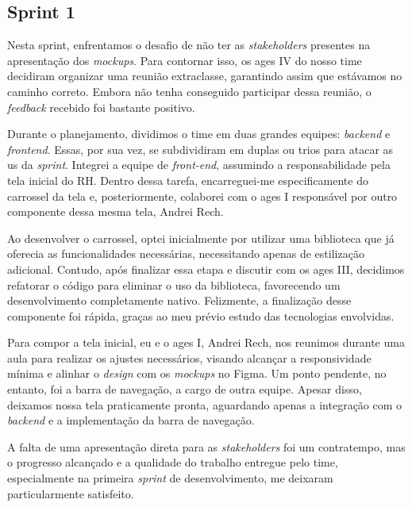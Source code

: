 \subsection{Sprint 1}

Nesta sprint, enfrentamos o desafio de não ter as \textit{stakeholders} presentes na apresentação dos \textit{mockups}. Para contornar isso, os \ac{ages} IV do nosso time decidiram organizar uma reunião extraclasse, garantindo assim que estávamos no caminho correto. Embora não tenha conseguido participar dessa reunião, o \textit{feedback} recebido foi bastante positivo.

Durante o planejamento, dividimos o time em duas grandes equipes: \textit{backend} e \textit{frontend}. Essas, por sua vez, se subdividiram em duplas ou trios para atacar as \ac{us} da \textit{sprint}. Integrei a equipe de \textit{front-end}, assumindo a responsabilidade pela tela inicial do RH. Dentro dessa tarefa, encarreguei-me especificamente do carrossel da tela e, posteriormente, colaborei com o \ac{ages} I responsável por outro componente dessa mesma tela, Andrei Rech.

Ao desenvolver o carrossel, optei inicialmente por utilizar uma biblioteca que já oferecia as funcionalidades necessárias, necessitando apenas de estilização adicional. Contudo, após finalizar essa etapa e discutir com os \ac{ages} III, decidimos refatorar o código para eliminar o uso da biblioteca, favorecendo um desenvolvimento completamente nativo. Felizmente, a finalização desse componente foi rápida, graças ao meu prévio estudo das tecnologias envolvidas.

Para compor a tela inicial, eu e o \ac{ages} I, Andrei Rech, nos reunimos durante uma aula para realizar os ajustes necessários, visando alcançar a responsividade mínima e alinhar o \textit{design} com os \textit{mockups} no Figma. Um ponto pendente, no entanto, foi a barra de navegação, a cargo de outra equipe. Apesar disso, deixamos nossa tela praticamente pronta, aguardando apenas a integração com o \textit{backend} e a implementação da barra de navegação.

A falta de uma apresentação direta para as \textit{stakeholders} foi um contratempo, mas o progresso alcançado e a qualidade do trabalho entregue pelo time, especialmente na primeira \textit{sprint} de desenvolvimento, me deixaram particularmente satisfeito.